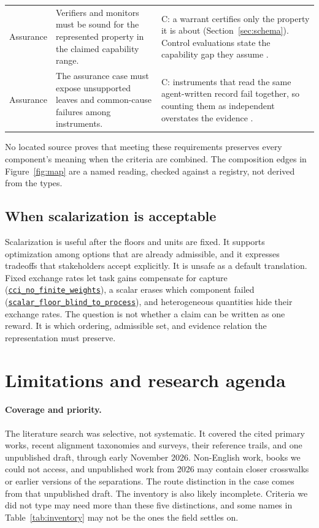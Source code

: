 \documentclass[11pt]{article}
\newcommand{\lean}[1]{\hyperref[lean:#1]{\nolinkurl{#1}}}
\begin{document}
{\begin{xltabular}{\textwidth}{@{}L{1.5cm} L{5.4cm} Y@{}}
Assurance & Verifiers and monitors must be sound for the represented property in the claimed capability range. & C: a warrant certifies only the property it is about (Section~\ref{sec:schema}). Control evaluations state the capability gap they assume \parencite{greenblatt2024aicontrol}. \\
Assurance & The assurance case must expose unsupported leaves and common-cause failures among instruments. & C: instruments that read the same agent-written record fail together, so counting them as independent overstates the evidence \parencite{clymer2024safetycases}. \\
\end{xltabular}
}

No located source proves that meeting these requirements preserves every component's meaning when the criteria are combined.
The composition edges in Figure~\ref{fig:map} are a named reading, checked against a registry, not derived from the types.

\subsection{When scalarization is acceptable}

Scalarization is useful after the floors and units are fixed.
It supports optimization among options that are already admissible, and it expresses tradeoffs that stakeholders accept explicitly.
It is unsafe as a default translation.
Fixed exchange rates let task gains compensate for capture (\lean{cci_no_finite_weights}), a scalar erases which component failed (\lean{scalar_floor_blind_to_process}), and heterogeneous quantities hide their exchange rates.
The question is not whether a claim can be written as one reward.
It is which ordering, admissible set, and evidence relation the representation must preserve.

\section{Limitations and research agenda}
\label{sec:limitations}

\paragraph{Coverage and priority.}
The literature search was selective, not systematic.
It covered the cited primary works, recent alignment taxonomies and surveys, their reference trails, and one unpublished draft, through early November 2026.
Non-English work, books we could not access, and unpublished work from 2026 may contain closer crosswalks or earlier versions of the separations.
The route distinction in the case comes from that unpublished draft.
The inventory is also likely incomplete.
Criteria we did not type may need more than these five distinctions, and some names in Table~\ref{tab:inventory} may not be the ones the field settles on.
\end{document}
